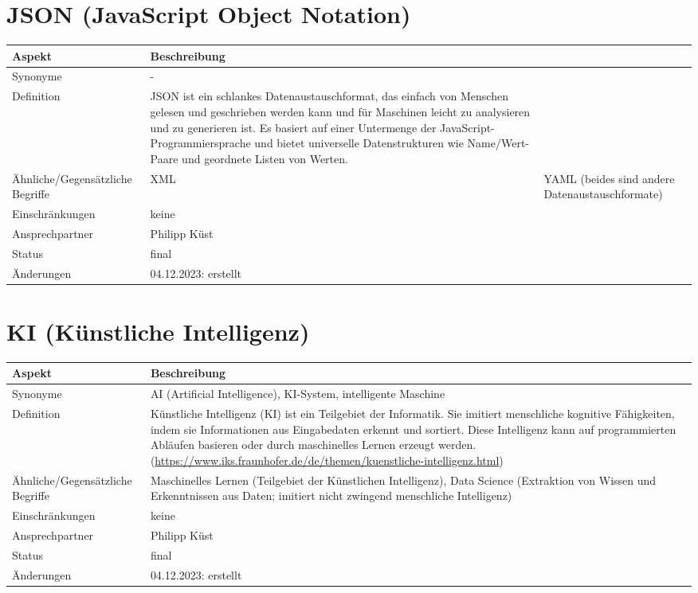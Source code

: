 \section{JSON (JavaScript Object Notation)}\label{sec:glossar_json}
\begin{tabularx}{\textwidth}{|l|X|}
    \hline
    \textbf{Aspekt} & \textbf{Beschreibung} \\
    \hline
    Synonyme & - \\
    \hline
    Definition & JSON ist ein schlankes Datenaustauschformat, das einfach von Menschen gelesen und geschrieben werden kann und für Maschinen leicht zu analysieren und zu generieren ist.
    Es basiert auf einer Untermenge der JavaScript-Programmiersprache und bietet universelle Datenstrukturen  wie Name/Wert-Paare und geordnete Listen von Werten. \\
    \hline
    Ähnliche/Gegensätzliche Begriffe & XML & YAML (beides sind andere Datenaustauschformate) \\
    \hline
    Einschränkungen & keine \\
    \hline
    Ansprechpartner & Philipp Küst \\
    \hline
    Status & final \\
    \hline
    Änderungen & 04.12.2023: erstellt \\
    \hline
\end{tabularx}

\section{KI (Künstliche Intelligenz)}\label{sec:glossar_ki}
\begin{tabularx}{\textwidth}{|l|X|}
    \hline
    \textbf{Aspekt} & \textbf{Beschreibung} \\
    \hline
    Synonyme & AI (Artificial Intelligence), KI-System, intelligente Maschine \\
    \hline
    Definition & Künstliche Intelligenz (KI) ist ein Teilgebiet der Informatik.
    Sie imitiert menschliche kognitive Fähigkeiten, indem sie Informationen aus Eingabedaten erkennt und sortiert.
    Diese Intelligenz kann auf programmierten Abläufen basieren oder durch maschinelles Lernen erzeugt werden.
    (\url{https://www.iks.fraunhofer.de/de/themen/kuenstliche-intelligenz.html}) \\
    \hline
    Ähnliche/Gegensätzliche Begriffe & Maschinelles Lernen (Teilgebiet der Künstlichen Intelligenz), Data Science (Extraktion von Wissen und Erkenntnissen aus Daten; imitiert nicht zwingend menschliche Intelligenz) \\
    \hline
    Einschränkungen & keine \\
    \hline
    Ansprechpartner & Philipp Küst \\
    \hline
    Status & final \\
    \hline
    Änderungen & 04.12.2023: erstellt \\
    \hline
\end{tabularx}

